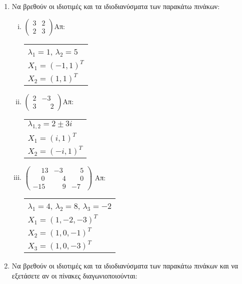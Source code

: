 \documentclass[a4paper,table]{report}
\begin{document}
\begin{center}
  \minibox{\large\bfseries \textcolor{Col1}{Ασκήσεις στις Ιδιοτιμές-Ιδιοδιανύσματα
  Πίνακα}}
\end{center}

\vspace{\baselineskip}

\begin{enumerate}

\item Να βρεθούν οι ιδιοτιμές και τα ιδιοδιανύσματα των παρακάτω πινάκων:

\begin{enumerate}[i)]

\item $\begin{pmatrix}
3 & 2 \\
2 & 3
\end{pmatrix}$\hfill Απ: \begin{tabular}{l}
$\lambda_1=1$, $\lambda_2=5$ \\
$X_1=(-1,1)^T$ \\
$X_2=(1,1)^T$
\end{tabular}

\item $\begin{pmatrix}
2 & -3 \\
3 & \phantom{-}2
\end{pmatrix}$\hfill Απ: \begin{tabular}{l}
$\lambda_{1,2}=2\pm 3i$ \\
$X_1=(i,1)^T$ \\
$X_2=(-i,1)^T$
\end{tabular}

\item $\begin{pmatrix}
\phantom{-}13 & -3 & \phantom{-}5 \\
\phantom{-}0 & \phantom{-}4 & \phantom{-}0 \\
-15 & \phantom{-}9 & -7
\end{pmatrix}$ \hfill Απ: \begin{tabular}{l}
$\lambda_1=4$, $\lambda_2=8$, $\lambda_3=-2$ \\ 
$X_1=(1,-2,-3)^T$ \\
$X_2=(1,0,-1)^T$ \\
$X_3=(1,0,-3)^T$
\end{tabular}

\end{enumerate}

\item Να βρεθούν οι ιδιοτιμές και τα ιδιοδιανύσματα των παρακάτω πινάκων 
  και να εξετάσετε αν οι πίνακες διαγωνιοποιούνται:


\end{enumerate}
\end{document}
